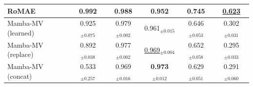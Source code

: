 \begin{table}[t]
\begin{tabular}{lccccc}
RoMAE                    & \textbf{0.992}                           & \textbf{0.988}                           & 0.952                                    & 0.745                                    & \underline{0.623}                        \\
\midrule
Mamba-MV (learned)       & 0.925$_{\pm 0.075}$                      & 0.979$_{\pm 0.002}$                      & 0.961$_{\pm 0.015}$                      & 0.646$_{\pm 0.053}$                      & 0.302$_{\pm 0.031}$                      \\
Mamba-MV (replace)       & 0.892$_{\pm 0.038}$                      & 0.977$_{\pm 0.002}$                      & \underline{0.969}$_{\pm 0.004}$          & 0.652$_{\pm 0.058}$                      & 0.295$_{\pm 0.033}$                      \\
Mamba-MV (concat)        & 0.533$_{\pm 0.257}$                      & 0.969$_{\pm 0.016}$                      & \textbf{0.973}$_{\pm 0.012}$             & 0.629$_{\pm 0.051}$                      & 0.291$_{\pm 0.060}$                      \\
\bottomrule
\end{tabular}
\end{table}
